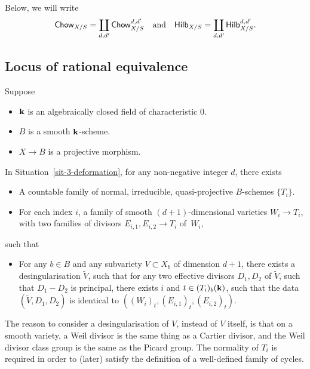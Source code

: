 Below, we will write
\[ \textsf{\textup{Chow}}_{X/S} = \coprod_{d,d'} \textsf{\textup{Chow}}_{X/S}^{d,d'}
    \quad \text{and} \quad 
    \textsf{\textup{Hilb}}_{X/S} = \coprod_{d,d'} \textsf{\textup{Hilb}}_{X/S}^{d,d'}. \]


\subsection{Locus of rational equivalence}

\begin{situation} \label{sit-3-deformation}
    Suppose
    \begin{itemize}
        \item
            $\bbk$ is an algebraically closed field of characteristic $0$.
        \item
            $B$ is a smooth $\bbk$-scheme.
        \item
            $X \to B$ is a projective morphism.
    \end{itemize}
\end{situation}

\begin{lemma} \label{lem-3-divisor}
    In Situation~\textup{\ref{sit-3-deformation}}, for any non-negative integer $d$, there exists
    \begin{itemize}
        \item
            A countable family of normal, irreducible, quasi-projective $B$-schemes $\{ T_i \}$.
        \item
            For each index $i$, a family of smooth $(d+1)$-dimensional varieties $W_i \to T_i$,
            with two families of divisors $E_{i,1}, E_{i,2} \to T_i$ of~$W_i$,
    \end{itemize}
    such that
    \begin{itemize}
        \item
            For any $b \in B$ and any subvariety $V \subset X_b$ of dimension $d+1$,
            there exists a desingularisation $\widetilde{V}$,
            such that for any two effective divisors $D_1, D_2$ of $\widetilde{V}$,
            such that $D_1 - D_2$ is principal,
            there exists $i$ and $t \in (T_i)_b (\bbk)$, 
            such that the data $(\widetilde{V}, D_1, D_2)$ is identical to
            $((W_i)_t, (E_{i,1})_t, (E_{i,2})_t)$.
    \end{itemize}
\end{lemma}

The reason to consider a desingularisation of $V$, instead of $V$ itself,
is that on a smooth variety, a Weil divisor is the same thing
as a Cartier divisor, and the Weil divisor class group is the same as the Picard group.
The normality of $T_i$ is required in order to (later) satisfy
the definition of a well-defined family of cycles.

